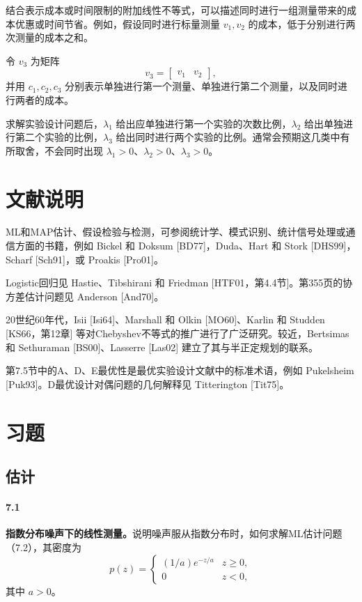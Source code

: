 结合表示成本或时间限制的附加线性不等式，可以描述同时进行一组测量带来的成本优惠或时间节省。例如，假设同时进行标量测量 $v_1,v_2$ 的成本，低于分别进行两次测量的成本之和。

令 $v_3$ 为矩阵
\[
 v_3=\begin{bmatrix}v_1&v_2\end{bmatrix},
\]
并用 $c_1,c_2,c_3$ 分别表示单独进行第一个测量、单独进行第二个测量，以及同时进行两者的成本。

求解实验设计问题后，$\lambda_1$ 给出应单独进行第一个实验的次数比例，$\lambda_2$ 给出单独进行第二个实验的比例，$\lambda_3$ 给出同时进行两个实验的比例。通常会预期这几类中有所取舍，不会同时出现 $\lambda_1>0$、$\lambda_2>0$、$\lambda_3>0$。

\section*{文献说明}
ML和MAP估计、假设检验与检测，可参阅统计学、模式识别、统计信号处理或通信方面的书籍，例如 Bickel 和 Doksum [BD77]，Duda、Hart 和 Stork [DHS99]，Scharf [Sch91]，或 Proakis [Pro01]。

Logistic回归见 Hastie、Tibshirani 和 Friedman [HTF01，第4.4节]。第355页的协方差估计问题见 Anderson [And70]。

20世纪60年代，Isii [Isi64]、Marshall 和 Olkin [MO60]、Karlin 和 Studden [KS66，第12章] 等对Chebyshev不等式的推广进行了广泛研究。较近，Bertsimas 和 Sethuraman [BS00]、Lasserre [Las02] 建立了其与半正定规划的联系。

第7.5节中的A、D、E最优性是最优实验设计文献中的标准术语，例如 Pukelsheim [Puk93]。D最优设计对偶问题的几何解释见 Titterington [Tit75]。

\section*{习题}
\subsection*{估计}
\paragraph{7.1}
\textbf{指数分布噪声下的线性测量。}说明噪声服从指数分布时，如何求解ML估计问题（7.2），其密度为
\[
 p(z)=\begin{cases}(1/a)e^{-z/a}&z\ge0,\\0&z<0,\end{cases}
\]
其中 $a>0$。

